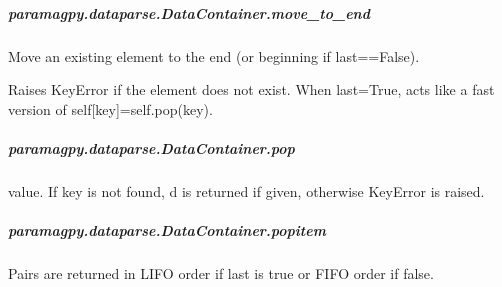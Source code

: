 \documentclass[a4paper,10pt,english,openany,oneside]{sphinxmanual}
\begin{document}
\begin{fulllineitems}
\begin{fulllineitems}
\subparagraph{paramagpy.dataparse.DataContainer.move\_to\_end}
\label{\detokenize{reference/generated/paramagpy.dataparse.DataContainer.move_to_end:paramagpy-dataparse-datacontainer-move-to-end}}\label{\detokenize{reference/generated/paramagpy.dataparse.DataContainer.move_to_end::doc}}

\begin{fulllineitems}
\label{\detokenize{reference/generated/paramagpy.dataparse.DataContainer.move_to_end:paramagpy.dataparse.DataContainer.move_to_end}}
Move an existing element to the end (or beginning if last==False).

Raises KeyError if the element does not exist.
When last=True, acts like a fast version of self{[}key{]}=self.pop(key).

\end{fulllineitems}



\subparagraph{paramagpy.dataparse.DataContainer.pop}
\label{\detokenize{reference/generated/paramagpy.dataparse.DataContainer.pop:paramagpy-dataparse-datacontainer-pop}}\label{\detokenize{reference/generated/paramagpy.dataparse.DataContainer.pop::doc}}

\begin{fulllineitems}
\label{\detokenize{reference/generated/paramagpy.dataparse.DataContainer.pop:paramagpy.dataparse.DataContainer.pop}}
value.  If key is not found, d is returned if given, otherwise KeyError
is raised.

\end{fulllineitems}



\subparagraph{paramagpy.dataparse.DataContainer.popitem}
\label{\detokenize{reference/generated/paramagpy.dataparse.DataContainer.popitem:paramagpy-dataparse-datacontainer-popitem}}\label{\detokenize{reference/generated/paramagpy.dataparse.DataContainer.popitem::doc}}

\begin{fulllineitems}
\label{\detokenize{reference/generated/paramagpy.dataparse.DataContainer.popitem:paramagpy.dataparse.DataContainer.popitem}}
Pairs are returned in LIFO order if last is true or FIFO order if false.


\end{fulllineitems}
\end{fulllineitems}
\end{fulllineitems}
\end{document}
